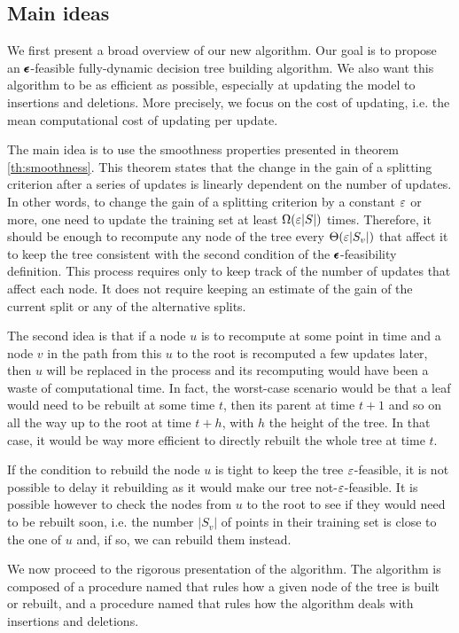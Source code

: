\subsection{Main ideas}\label{subsec:fudy_main_ideas}
We first present a broad overview of our new algorithm. Our goal is to propose an $\pmb{\epsilon}$-feasible fully-dynamic decision tree building algorithm. We also want this algorithm to be as efficient as possible, especially at updating the model to insertions and deletions. More precisely, we focus on the  cost of updating, i.e. the mean computational cost of updating per update.

The main idea is to use the smoothness properties presented in theorem \ref{th:smoothness}. This theorem states that the change in the gain of a splitting criterion after a series of updates is linearly dependent on the number of updates. In other words, to change the gain of a splitting criterion by a constant $\varepsilon$ or more, one need to update the training set at least $\Omega(\varepsilon |S|)$ times. Therefore, it should be enough to recompute any node of the tree every $\Theta(\varepsilon |S_v|)$ that affect it to keep the tree consistent with the second condition of the $\pmb{\epsilon}$-feasibility definition. This process requires only to keep track of the number of updates that affect each node. It does not require keeping an estimate of the gain of the current split or any of the alternative splits.

The second idea is that if a node $u$ is to recompute at some point in time and a node $v$ in the path from this $u$ to the root is recomputed a few updates later, then $u$ will be replaced in the process and its recomputing would have been a waste of computational time. In fact, the worst-case scenario would be that a leaf would need to be rebuilt at some time $t$, then its parent at time $t+1$ and so on all the way up to the root at time $t+h$, with $h$ the height of the tree. In that case, it would be way more efficient to directly rebuilt the whole tree at time $t$.

If the condition to rebuild the node $u$ is tight to keep the tree $\varepsilon$-feasible, it is not possible to delay it rebuilding as it would make our tree not-$\varepsilon$-feasible. It is possible however to check the nodes from $u$ to the root to see if they would need to be rebuilt soon, i.e. the number $|S_v|$ of points in their training set is close to the one of $u$ and, if so, we can rebuild them instead.

We now proceed to the rigorous presentation of the algorithm. The algorithm is composed of a procedure named \AlgoBuild{} that rules how a given node of the tree is built or rebuilt, and a procedure named \AlgoUpdate{} that rules how the algorithm deals with insertions and deletions.

